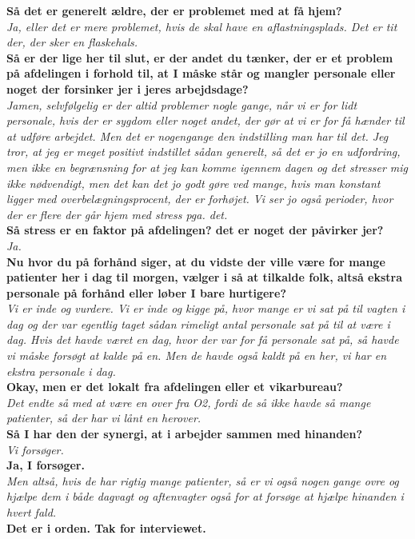 \noindent
\textbf{Så det er generelt ældre, der er problemet med at få hjem?} \\
\noindent
\textit{Ja, eller det er mere problemet, hvis de skal have en aflastningsplads. Det er tit der, der sker en flaskehals.}  \\
\noindent
\textbf{Så er der lige her til slut, er der andet du tænker, der er et problem på afdelingen i forhold til, at I måske står og mangler personale eller noget der forsinker jer i jeres arbejdsdage?} \\
\noindent
\textit{Jamen, selvfølgelig er der altid problemer nogle gange, når vi er for lidt personale, hvis der er sygdom eller noget andet, der gør at vi er for få hænder til at udføre arbejdet. Men det er nogengange den indstilling man har til det. Jeg tror, at jeg er meget positivt indstillet sådan generelt, så det er jo en udfordring, men ikke en begrænsning for at jeg kan komme igennem dagen og det stresser mig ikke nødvendigt, men det kan det jo godt gøre ved mange, hvis man konstant ligger med overbelægningsprocent, der er forhøjet. Vi ser jo også perioder, hvor der er flere der går hjem med stress pga. det. } \\ \noindent
\textbf{Så stress er en faktor på afdelingen? det er noget der påvirker jer?} \\
\noindent
\textit{ Ja.} \\
\noindent
\textbf{Nu hvor du på forhånd siger, at du vidste der ville være for mange patienter her i dag til morgen, vælger i så at tilkalde folk, altså ekstra personale på forhånd eller løber I bare hurtigere? } \\
\noindent
\textit{Vi er inde og vurdere. Vi er inde og kigge på, hvor mange er vi sat på til vagten i dag og der var egentlig taget sådan rimeligt antal personale sat på til at være i dag.
Hvis det havde været en dag, hvor der var for få personale sat på, så havde vi måske forsøgt at kalde på en. Men de havde også kaldt på en her, vi har en ekstra personale i dag.} \\
\noindent
\textbf{Okay, men er det lokalt fra afdelingen eller et vikarbureau? } \\
\noindent
\textit{ Det endte så med at være en over fra O2, fordi de så ikke havde så mange patienter, så der har vi lånt en herover. } \\
\noindent
\textbf{Så I har den der synergi, at i arbejder sammen med hinanden?} \\
\noindent
\textit{Vi forsøger.} \\
\noindent
\textbf{Ja, I forsøger.} \\
\noindent
\textit{Men altså, hvis de har rigtig mange patienter, så er vi også nogen gange ovre og hjælpe dem i både dagvagt og aftenvagter også for at forsøge at hjælpe hinanden i hvert fald.} \\
\noindent
\textbf{Det er i orden. Tak for interviewet.} \\





